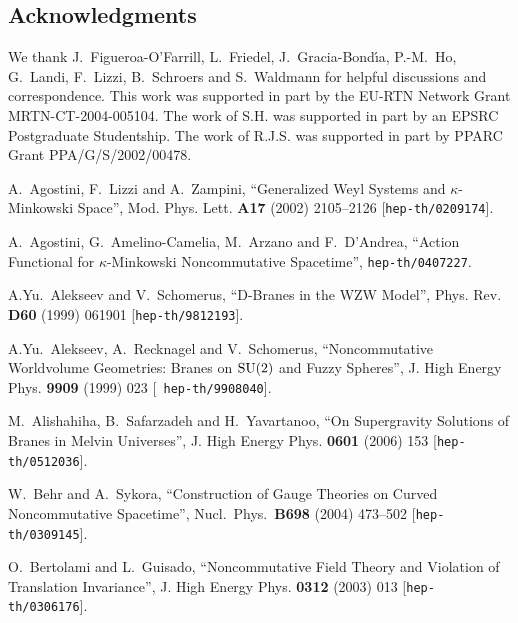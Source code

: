 \documentclass[11pt,a4paper]{article}
\newcommand{\1}{\mathbb{1}}
\begin{document}
\subsection*{Acknowledgments}

We thank J.~Figueroa-O'Farrill, L.~Friedel, J.~Gracia-Bond\'{\i}a,
P.-M.~Ho, G.~Landi, F.~Lizzi, B.~Schroers and S.~Waldmann for helpful
discussions and correspondence. This work was supported in part by the
EU-RTN Network Grant MRTN-CT-2004-005104. The work of S.H. was
supported in part by an EPSRC Postgraduate Studentship. The work of
R.J.S. was supported in part by PPARC Grant PPA/G/S/2002/00478.

\begin{thebibliography}{99}

\baselineskip=12pt

 A.~Agostini, F.~Lizzi and A.~Zampini, ``Generalized
  Weyl Systems and $\kappa$-Minkowski Space'', Mod. Phys. Lett. {\bf
  A17} (2002) 2105--2126 [{\tt hep-th/0209174}].

  A.~Agostini, G.~Amelino-Camelia, M.~Arzano and F.~D'Andrea,
  ``Action Functional for $\kappa$-Minkowski Noncommutative Spacetime'',
  {\tt hep-th/0407227}.

 A.Yu.~Alekseev and V.~Schomerus, ``D-Branes in the WZW
  Model'', Phys. Rev. {\bf D60} (1999) 061901 [{\tt hep-th/9812193}].

 A.Yu.~Alekseev, A.~Recknagel and V.~Schomerus,
  ``Noncommutative Worldvolume Geometries: Branes on ${\rm SU}(2)$ and
  Fuzzy Spheres'', J. High Energy Phys. {\bf 9909} (1999) 023 [{\tt
    hep-th/9908040}].

  M.~Alishahiha, B.~Safarzadeh and H.~Yavartanoo,
  ``On Supergravity Solutions of Branes in Melvin Universes'',
 J. High Energy Phys. {\bf 0601} (2006) 153 [{\tt hep-th/0512036}].

  W.~Behr and A.~Sykora,
  ``Construction of Gauge Theories on Curved Noncommutative Spacetime'',
  Nucl.\ Phys.\  {\bf B698} (2004) 473--502
  [{\tt hep-th/0309145}].

 O.~Bertolami and L.~Guisado, ``Noncommutative Field
  Theory and Violation of Translation Invariance'', J. High Energy
  Phys. {\bf 0312} (2003) 013 [{\tt hep-th/0306176}].


\end{thebibliography}
\end{document}
